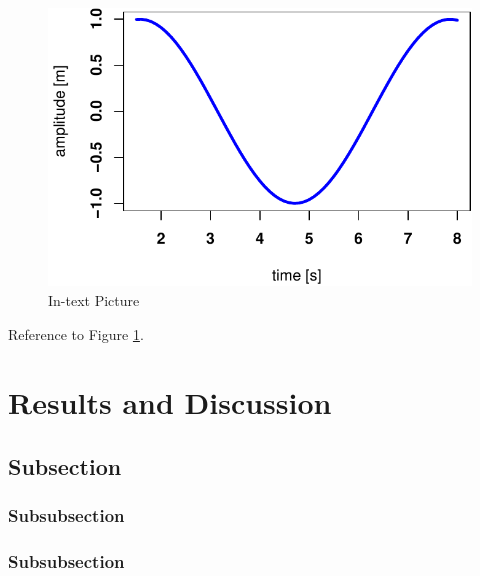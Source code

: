 \documentclass[fleqn,10pt,lineno]{wlpeerj} %
\theoremstyle{definition}
\theoremstyle{definition}
\theoremstyle{definition}
\theoremstyle{remark}
\begin{document}
\lipsum[9] 

\begin{figure}
\includegraphics[width=1\linewidth]{peer_j_migration_dynamics_files/figure-latex/results-1} \caption{In-text Picture}\label{fig:results}
\end{figure}

Reference to Figure \ref{fig:results}.

\section*{Results and Discussion}\label{results-and-discussion}

\lipsum[10] 

\subsection*{Subsection}\label{subsection-2}

\lipsum[11] 

\subsubsection*{Subsubsection}\label{subsubsection}

\lipsum[12] 

\subsubsection*{Subsubsection}\label{subsubsection-1}
\end{document}
